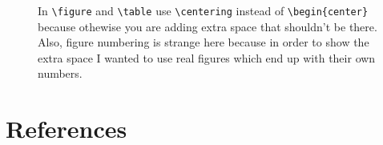 \documentclass[pharmbio]{pbpreprint}
\begin{document}
\begin{figure}
\hfill
{}
\caption{In \texttt{\textbackslash figure} and \texttt{\textbackslash table} use \texttt{\textbackslash centering} instead of \texttt{\textbackslash begin\{center\}} because othewise you are adding extra space that shouldn't be there. Also, figure numbering is strange here because in order to show the extra space I wanted to use real figures which end up with their own numbers.}
\end{figure}

\section{References}
\printbibliography[heading=none]
\end{document}
